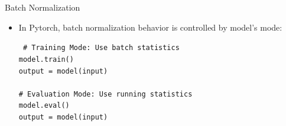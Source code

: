 \documentclass[10pt]{beamer}
\theoremstyle{remark}
\theoremstyle{definition}
\begin{document}
\begin{frame}{Batch Normalization}
    \begin{itemize}
        \item In Pytorch, batch normalization behavior is controlled by model's mode:
            \begin{block}{}
        \texttt{\small
        \# Training Mode: Use batch statistics\\
        model.train() \\
        output = model(input) \\
        \\
        \# Evaluation Mode: Use running statistics\\
        model.eval() \\
         output = model(input)
        }
    \end{block}
    \end{itemize}
\end{frame}



    

\end{document}
